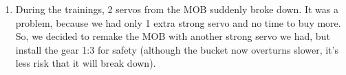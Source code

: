 \begin{enumerate}
\begin{enumerate}
		\item During the trainings, 2 servos from the MOB suddenly broke down. It was a problem, because we had only 1 extra strong servo and no time to buy more. So, we decided to remake the MOB with another strong servo we had, but install the gear 1:3 for safety (although the bucket now overturns slower, it's less risk that it will break down).
		\begin{figure}[H]
			\begin{minipage}[h]{0.31\linewidth}
			\end{minipage}
			\hfill
			\begin{minipage}[h]{0.31\linewidth}

\end{minipage}
\end{figure}
\end{enumerate}
\end{enumerate}

